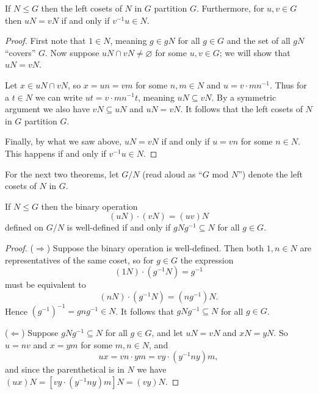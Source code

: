 \documentclass[../m171main.tex]{subfiles}
\begin{document}
\begin{theorem}[]
    If $N \leq G$ then the left cosets of $N$ in $G$ partition $G$.
    Furthermore, for $u,v \in G$ then $uN = vN$ if and only if $v^{-1} u \in N$.
\end{theorem}

\begin{proof}
    First note that $1 \in N$, meaning $g \in gN$ for all $g \in G$ and the set of all $gN$ ``covers'' $G$.
    Now suppose $uN \cap vN \neq \varnothing$ for some $u,v \in G$; we will show that $uN = vN$.

    Let $x \in uN \cap vN$, so $x = un = vm$ for some $n,m \in N$ and $u = v \cdot mn^{-1}$.
    Thus for a $t \in N$ we can write $ut = v \cdot mn^{-1} t$, meaning $uN \subseteq vN$.
    By a symmetric argument we also have $vN \subseteq uN$ and $uN = vN$.
    It follows that the left cosets of $N$ in $G$ partition $G$.

    Finally, by what we saw above, $uN = vN$ if and only if $u = vn$ for some $n \in N$.
    This happens if and only if $v^{-1} u \in N$.
\end{proof}

For the next two theorems, let $G / N$ (read aloud as ``$G$ mod $N$'') denote the left cosets of $N$ in $G$.

\begin{theorem}[] \label{thm:cosets_well_defined}
    If $N \leq G$ then the binary operation
    \[ (uN) \cdot (vN) = (uv)N \]
    defined on $G / N$ is well-defined if and only if $gNg^{-1} \subseteq N$ for all $g \in G$.
\end{theorem}

\pagebreak

\begin{proof}
    ($\Rightarrow$)
    Suppose the binary operation is well-defined.
    Then both $1,n \in N$ are representatives of the same coset, so for $g \in G$ the expression
    \[ (1N) \cdot (g^{-1} N) = g^{-1}  \]
    must be equivalent to
    \[ (nN) \cdot (g^{-1} N) = (ng^{-1}) N. \]
    Hence $\left( g^{-1} \right)^{-1} = gng^{-1} \in N$.
    It follows that $gNg^{-1} \subseteq N$ for all $g \in G$.
    \medskip

    ($\Leftarrow$)
    Suppose $gNg^{-1} \subseteq N$ for all $g \in G$, and let $uN = vN$ and $xN = yN$.
    So $u = nv$ and $x = ym$ for some $m,n \in N$, and
    \[ ux = vn \cdot ym = vy \cdot \left( y^{-1} ny \right) m, \]
    and since the parenthetical is in $N$ we have $(ux)N = \left[ vy \cdot \left( y^{-1} ny \right) m \right] N = (vy)N$.
\end{proof}
\end{document}
